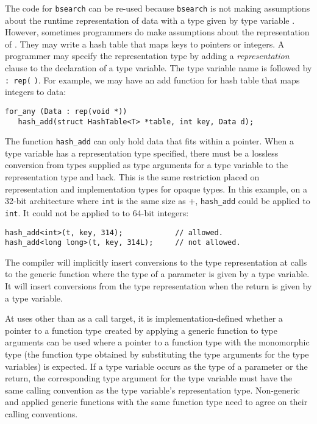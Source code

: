 The code for \lstinline+bsearch+ can be re-used because \lstinline+bsearch+ is
not making assumptions about the runtime representation of data with a type
given by type variable .  However, sometimes programmers do make assumptions 
about the representation of .  They may write a hash table that maps
keys to pointers or integers.    A programmer may specify the representation type by
adding a {\it representation} clause to the declaration of a type variable.   The
type variable name is followed by \lstinline+: rep(+ \lstinline+)+.
For example, we may have an add function for hash table that maps integers to data:
\begin{lstlisting}
for_any (Data : rep(void *))
   hash_add(struct HashTable<T> *table, int key, Data d);
\end{lstlisting}
The function \lstinline+hash_add+ can only hold data that fits within a 
\uncheckedptrvoid{} pointer.  When a type variable has a representation type specified, 
there must be a lossless conversion from types supplied as type arguments for
a type variable to the representation type and back.
This is the same restriction placed on 
representation and implementation types for opaque types.   In this example, on a
32-bit architecture where \lstinline+int+ is the same size as +\uncheckedptrvoid{}, 
\lstinline+hash_add+ could be applied to \lstinline+int+.  It could not be applied to
to 64-bit integers:
\begin{lstlisting}
hash_add<int>(t, key, 314);            // allowed.
hash_add<long long>(t, key, 314L);     // not allowed.
\end{lstlisting}
The compiler will implicitly insert conversions to the type representation
at calls to the generic function where the type of a parameter is given
by a type variable.  It will insert conversions from the type representation
when the return is given by a type variable.

At uses other than as a call target, it is implementation-defined whether a pointer to a function type 
created by applying a generic function to type arguments can be used where
a pointer to a function type with the monomorphic type (the function type obtained
by substituting the type arguments for the type variables) is expected.  If a type
variable occurs as the type of a parameter or the return, the corresponding type argument
for the type variable must have the same calling convention as the type variable's
representation type.   Non-generic and applied generic functions with the same function type
need to agree on their calling conventions.

